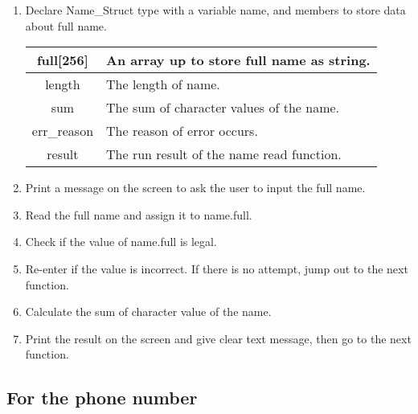 \documentclass[12pt]{article}
\begin{document}
	\begin{enumerate}
		\item Declare Name\_Struct type with a variable name, and members to store data about full name.
		\begin{table}[H]
			\centering
			\begin{tabular}{|c|l|}
				\hline
				full{[}256{]} & An array up to store full name as string. \\ \hline
				length        & The length of name.                       \\ \hline
				sum           & The sum of character values of the name.  \\ \hline
				err\_reason   & The reason of error occurs.               \\ \hline
				result        & The run result of the name read function. \\ \hline
			\end{tabular}
		\end{table}
		\item Print a message on the screen to ask the user to input the full name.
		
		\item Read the full name and assign it to name.full.
		
		\item Check if the value of name.full is legal.
		
		\item Re-enter if the value is incorrect. If there is no attempt, jump out to the next function.
		
		\item Calculate the sum of character value of the name.
		
		\item Print the result on the screen and give clear text message, then go to the next function.
	\end{enumerate}

	\subsection{For the phone number}
	
\end{document}
